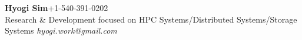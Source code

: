 {\textbf{\Large Hyogi Sim}\hfill{\small +1-540-391-0202}}\\
{\small
{Research \& Development focused on HPC Systems/Distributed Systems/Storage Systems}
    \hfill{\emph{\small hyogi.work@gmail.com}}\\
}
